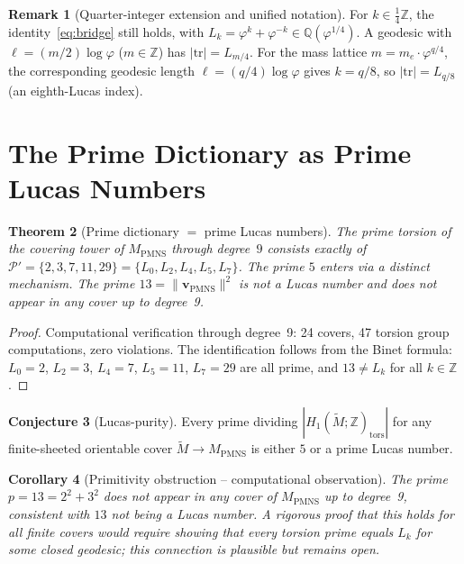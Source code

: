 \documentclass[12pt]{article}
\newtheorem{theorem}{Theorem}
\newtheorem{corollary}[theorem]{Corollary}
\theoremstyle{definition}
\newtheorem{remark}[theorem]{Remark}
\newtheorem{conjecture}[theorem]{Conjecture}
\newcommand{\Z}{\mathbb{Z}}
\newcommand{\Q}{\mathbb{Q}}
\newcommand{\ph}{\varphi}
\newcommand{\logph}{\log\ph}
\begin{document}
\begin{remark}[Quarter-integer extension and unified notation]
\label{rem:quarter}
For $k \in \frac{1}{4}\Z$, the identity~\eqref{eq:bridge} still holds,
with $L_k = \ph^k + \ph^{-k} \in \Q(\ph^{1/4})$.
A geodesic with $\ell = (m/2)\logph$ ($m \in \Z$) has
$|\mathrm{tr}| = L_{m/4}$.
For the mass lattice $m = m_e \cdot \ph^{q/4}$, the corresponding
geodesic length $\ell = (q/4)\logph$ gives $k = q/8$, so
$|\mathrm{tr}| = L_{q/8}$ (an eighth-Lucas index).
\end{remark}

\section{The Prime Dictionary as Prime Lucas Numbers}

\begin{theorem}[Prime dictionary $=$ prime Lucas numbers]
\label{thm:lucas-dict}
The prime torsion of the covering tower of $M_{\mathrm{PMNS}}$
through degree~$9$ consists exactly of
$\mathcal{P}' = \{2,3,7,11,29\} = \{L_0, L_2, L_4, L_5, L_7\}$.
The prime $5$ enters via a distinct mechanism.
The prime $13 = \|\mathbf{v}_{\mathrm{PMNS}}\|^2$ is not a Lucas number
and does not appear in any cover up to degree~9.
\end{theorem}

\begin{proof}
Computational verification through degree~9: 24 covers, 47 torsion
group computations, zero violations. The identification follows from
the Binet formula: $L_0=2$, $L_2=3$, $L_4=7$, $L_5=11$, $L_7=29$
are all prime, and $13 \neq L_k$ for all $k \in \Z$.
\end{proof}

\begin{conjecture}[Lucas-purity]
\label{conj:lucas-purity}
Every prime dividing $|H_1(\tilde{M};\Z)_{\mathrm{tors}}|$ for any
finite-sheeted orientable cover $\tilde{M} \to M_{\mathrm{PMNS}}$
is either $5$ or a prime Lucas number.
\end{conjecture}

\begin{corollary}[Primitivity obstruction -- computational observation]
\label{cor:primitivity}
The prime $p = 13 = 2^2+3^2$ does not appear in any cover of
$M_{\mathrm{PMNS}}$ up to degree~9, consistent with $13$ not being
a Lucas number. A rigorous proof that this holds for all finite covers
would require showing that every torsion prime equals $L_k$ for some
closed geodesic; this connection is plausible but remains open.
\end{corollary}
\end{document}
